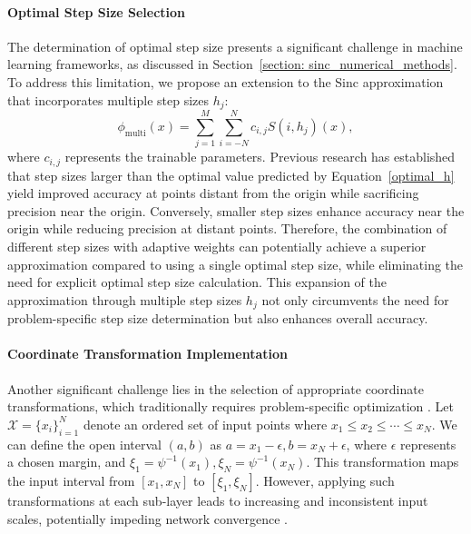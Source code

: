 \paragraph{Optimal Step Size Selection}
The determination of optimal step size presents a significant challenge in machine learning frameworks, as discussed in Section~\ref{section: sinc_numerical_methods}. To address this limitation, we propose an extension to the Sinc approximation that incorporates multiple step sizes $h_j$:
\begin{equation}
    \phi_{\mathrm{multi}}(x) = \sum_{j=1}^{M}\sum_{i=-N}^N c_{i,j} S(i, h_j)(x),
\end{equation}
where $c_{i,j}$ represents the trainable parameters. Previous research \citep{stenger2012numerical} has established that step sizes larger than the optimal value predicted by Equation~\ref{optimal_h} yield improved accuracy at points distant from the origin while sacrificing precision near the origin. Conversely, smaller step sizes enhance accuracy near the origin while reducing precision at distant points. Therefore, the combination of different step sizes with adaptive weights can potentially achieve a superior approximation compared to using a single optimal step size, while eliminating the need for explicit optimal step size calculation. This expansion of the approximation through multiple step sizes $h_j$ not only circumvents the need for problem-specific step size determination but also enhances overall accuracy.

\paragraph{Coordinate Transformation Implementation}
Another significant challenge lies in the selection of appropriate coordinate transformations, which traditionally requires problem-specific optimization \citep{stenger2000summary}. Let $\mathcal{X}=\{x_i\}_{i=1}^{N}$ denote an ordered set of input points where $x_1 \leq x_2 \leq \cdots \leq x_N$. We can define the open interval $(a,b)$ as $a=x_1-\epsilon, b=x_N+\epsilon$, where $\epsilon$ represents a chosen margin, and $\xi_1=\psi^{-1}(x_1),\xi_N=\psi^{-1}(x_N)$. This transformation maps the input interval from $[x_1,x_N]$ to $[\xi_1,\xi_N]$. However, applying such transformations at each sub-layer leads to increasing and inconsistent input scales, potentially impeding network convergence \citep{ioffe2015batch}. 

